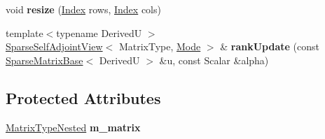\begin{DoxyCompactItemize}
\item 
\mbox{\label{class_eigen_1_1_sparse_self_adjoint_view_a6cea37a2e08d934d99936271f182926b}} 
void {\bfseries resize} (\mbox{\hyperlink{struct_eigen_1_1_eigen_base_a554f30542cc2316add4b1ea0a492ff02}{Index}} rows, \mbox{\hyperlink{struct_eigen_1_1_eigen_base_a554f30542cc2316add4b1ea0a492ff02}{Index}} cols)
\item 
\mbox{\label{class_eigen_1_1_sparse_self_adjoint_view_a9808de434246e9f337588f57ce96068b}} 
{\footnotesize template$<$typename DerivedU $>$ }\\\mbox{\hyperlink{class_eigen_1_1_sparse_self_adjoint_view}{Sparse\+Self\+Adjoint\+View}}$<$ Matrix\+Type, \mbox{\hyperlink{struct_mode}{Mode}} $>$ \& {\bfseries rank\+Update} (const \mbox{\hyperlink{class_eigen_1_1_sparse_matrix_base}{Sparse\+Matrix\+Base}}$<$ DerivedU $>$ \&u, const Scalar \&alpha)
\end{DoxyCompactItemize}
\subsection*{Protected Attributes}
\begin{DoxyCompactItemize}
\item 
\mbox{\label{class_eigen_1_1_sparse_self_adjoint_view_ac2553431de29927f0ce270cf4b07dacd}} 
\mbox{\hyperlink{struct_eigen_1_1internal_1_1true__type}{Matrix\+Type\+Nested}} {\bfseries m\+\_\+matrix}
\end{DoxyCompactItemize}

